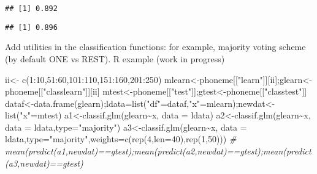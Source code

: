 \documentclass[
]{book}
\newenvironment{Shaded}{\begin{snugshade}}{\end{snugshade}}
\newcommand{\AttributeTok}[1]{\textcolor[rgb]{0.77,0.63,0.00}{#1}}
\newcommand{\CommentTok}[1]{\textcolor[rgb]{0.56,0.35,0.01}{\textit{#1}}}
\newcommand{\DecValTok}[1]{\textcolor[rgb]{0.00,0.00,0.81}{#1}}
\newcommand{\FunctionTok}[1]{\textcolor[rgb]{0.00,0.00,0.00}{#1}}
\newcommand{\NormalTok}[1]{#1}
\newcommand{\OtherTok}[1]{\textcolor[rgb]{0.56,0.35,0.01}{#1}}
\newcommand{\SpecialCharTok}[1]{\textcolor[rgb]{0.00,0.00,0.00}{#1}}
\newcommand{\StringTok}[1]{\textcolor[rgb]{0.31,0.60,0.02}{#1}}
\begin{document}
\begin{verbatim}
## [1] 0.892
\end{verbatim}

\begin{Shaded}
\end{Shaded}

\begin{verbatim}
## [1] 0.896
\end{verbatim}

Add utilities in the classification functions: for example, majority voting scheme (by default ONE vs REST). R example (work in progress)

\begin{Shaded}
\begin{Highlighting}[]
\NormalTok{ii}\OtherTok{\textless{}{-}}  \FunctionTok{c}\NormalTok{(}\DecValTok{1}\SpecialCharTok{:}\DecValTok{10}\NormalTok{,}\DecValTok{51}\SpecialCharTok{:}\DecValTok{60}\NormalTok{,}\DecValTok{101}\SpecialCharTok{:}\DecValTok{110}\NormalTok{,}\DecValTok{151}\SpecialCharTok{:}\DecValTok{160}\NormalTok{,}\DecValTok{201}\SpecialCharTok{:}\DecValTok{250}\NormalTok{)}
\NormalTok{mlearn}\OtherTok{\textless{}{-}}\NormalTok{phoneme[[}\StringTok{"learn"}\NormalTok{]][ii];glearn}\OtherTok{\textless{}{-}}\NormalTok{phoneme[[}\StringTok{"classlearn"}\NormalTok{]][ii]}
\NormalTok{mtest}\OtherTok{\textless{}{-}}\NormalTok{phoneme[[}\StringTok{"test"}\NormalTok{]];gtest}\OtherTok{\textless{}{-}}\NormalTok{phoneme[[}\StringTok{"classtest"}\NormalTok{]]}
\NormalTok{dataf}\OtherTok{\textless{}{-}}\FunctionTok{data.frame}\NormalTok{(glearn);ldata}\OtherTok{=}\FunctionTok{list}\NormalTok{(}\StringTok{"df"}\OtherTok{=}\NormalTok{dataf,}\StringTok{"x"}\OtherTok{=}\NormalTok{mlearn);newdat}\OtherTok{\textless{}{-}}\FunctionTok{list}\NormalTok{(}\StringTok{"x"}\OtherTok{=}\NormalTok{mtest)}
\NormalTok{a1}\OtherTok{\textless{}{-}}\FunctionTok{classif.glm}\NormalTok{(glearn}\SpecialCharTok{\textasciitilde{}}\NormalTok{x, }\AttributeTok{data =}\NormalTok{ ldata)}
\NormalTok{a2}\OtherTok{\textless{}{-}}\FunctionTok{classif.glm}\NormalTok{(glearn}\SpecialCharTok{\textasciitilde{}}\NormalTok{x, }\AttributeTok{data =}\NormalTok{ ldata,}\AttributeTok{type=}\StringTok{"majority"}\NormalTok{)}
\NormalTok{a3}\OtherTok{\textless{}{-}}\FunctionTok{classif.glm}\NormalTok{(glearn}\SpecialCharTok{\textasciitilde{}}\NormalTok{x, }\AttributeTok{data =}\NormalTok{ ldata,}\AttributeTok{type=}\StringTok{"majority"}\NormalTok{,}\AttributeTok{weights=}\FunctionTok{c}\NormalTok{(}\FunctionTok{rep}\NormalTok{(}\DecValTok{4}\NormalTok{,}\AttributeTok{len=}\DecValTok{40}\NormalTok{),}\FunctionTok{rep}\NormalTok{(}\DecValTok{1}\NormalTok{,}\DecValTok{50}\NormalTok{)))}
\CommentTok{\# mean(predict(a1,newdat)==gtest);mean(predict(a2,newdat)==gtest);mean(predict(a3,newdat)==gtest)}
\end{Highlighting}
\end{Shaded}
\end{document}

